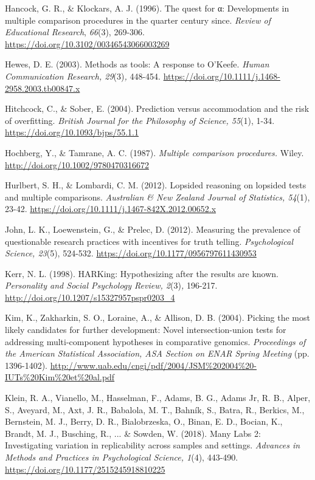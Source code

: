 \documentclass[authordate, meta]{jote-new-article}
\begin{document}
	Hancock, G. R., \& Klockars, A. J. (1996). The quest for α: Developments in multiple comparison procedures in the quarter century since. \emph{Review of Educational Research}, \emph{66}(3), 269-306. \url{https://doi.org/10.3102/00346543066003269}



	Hewes, D. E. (2003). Methods as tools: A response to O'Keefe. \emph{Human Communication Research, 29}(3)\emph{,} 448-454. \url{https://doi.org/10.1111/j.1468-2958.2003.tb00847.x}



	Hitchcock, C., \& Sober, E. (2004). Prediction versus accommodation and the risk of overfitting. \emph{British Journal for the Philosophy of Science, 55}(1), 1-34. \url{https://doi.org/10.1093/bjps/55.1.1}



	Hochberg, Y., \& Tamrane, A. C. (1987). \emph{Multiple comparison procedures.} Wiley. \url{http://doi.org/10.1002/9780470316672}



	Hurlbert, S. H., \& Lombardi, C. M. (2012). Lopsided reasoning on lopsided tests and multiple comparisons. \emph{Australian \& New Zealand Journal of Statistics, 54}(1), 23-42. \url{https://doi.org/10.1111/j.1467-842X.2012.00652.x}



	John, L. K., Loewenstein, G., \& Prelec, D. (2012). Measuring the prevalence of questionable research practices with incentives for truth telling. \emph{Psychological Science, 23}(5), 524-532. \url{https://doi.org/10.1177/0956797611430953}



	Kerr, N. L. (1998). HARKing: Hypothesizing after the results are known. \emph{Personality and Social Psychology Review, 2}(3)\emph{, }196-217. \url{http://doi.org/10.1207/s15327957pspr0203\_4}



	Kim, K., Zakharkin, S. O., Loraine, A., \& Allison, D. B. (2004). Picking the most likely candidates for further development: Novel intersection-union tests for addressing multi-component hypotheses in comparative genomics. \emph{Proceedings of the American Statistical Association, ASA Section on ENAR Spring Meeting} (pp. 1396-1402). \url{http://www.uab.edu/cngi/pdf/2004/JSM\%202004\%20-IUTs\%20Kim\%20et\%20al.pdf}



	Klein, R. A., Vianello, M., Hasselman, F., Adams, B. G., Adams Jr, R. B., Alper, S., Aveyard, M., Axt, J. R., Babalola, M. T., Bahník, S., Batra, R., Berkics, M., Bernstein, M. J., Berry, D. R., Bialobrzeska, O., Binan, E. D., Bocian, K., Brandt, M. J., Busching, R., ... \& Sowden, W. (2018). Many Labs 2: Investigating variation in replicability across samples and settings. \emph{Advances in Methods and Practices in Psychological Science, 1}(4), 443-490. \url{https://doi.org/10.1177/2515245918810225}
\end{document}
